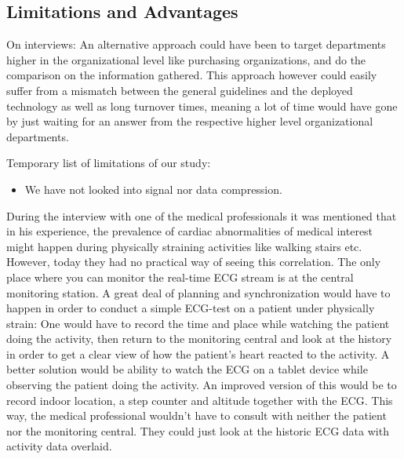 
\subsection{Limitations and Advantages} %
\label{sub:limitations}


On interviews: An alternative approach could have been to target departments higher in the organizational level like purchasing organizations, and do the comparison on the information gathered. This approach however could easily suffer from a mismatch between the general guidelines and the deployed technology as well as long turnover times, meaning a lot of time would have gone by just waiting for an answer from the respective higher level organizational departments.

Temporary list of limitations of our study:

\begin{itemize}

  \item We have not looked into signal nor data compression.

\end{itemize}

During the interview with one of the medical professionals it was mentioned that in his experience, the prevalence of cardiac abnormalities of medical interest might happen during physically straining activities like walking stairs etc. However, today they had no practical way of seeing this correlation. The only place where you can monitor the real-time ECG stream is at the central monitoring station. A great deal of planning and synchronization would have to happen in order to conduct a simple ECG-test on a patient under physically strain: One would have to record the time and place while watching the patient doing the activity, then return to the monitoring central and look at the history in order to get a clear view of how the patient's heart reacted to the activity. A better solution would be ability to watch the ECG on a tablet device while observing the patient doing the activity. An improved version of this would be to record indoor location, a step counter and altitude together with the ECG. This way, the medical professional wouldn't have to consult with neither the patient nor the monitoring central. They could just look at the historic ECG data with activity data overlaid.


